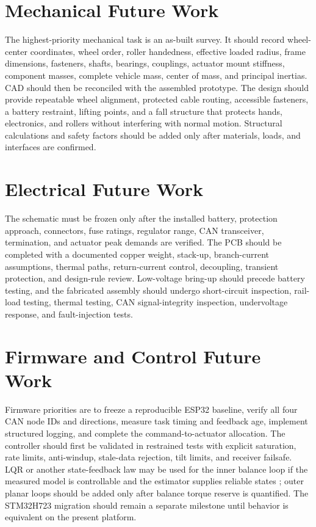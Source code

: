 \section{Mechanical Future Work}\label{mechanical-future-work}

The highest-priority mechanical task is an as-built survey. It should
record wheel-center coordinates, wheel order, roller handedness,
effective loaded radius, frame dimensions, fasteners, shafts, bearings,
couplings, actuator mount stiffness, component masses, complete vehicle
mass, center of mass, and principal inertias. CAD should then be
reconciled with the assembled prototype. The design should provide
repeatable wheel alignment, protected cable routing, accessible
fasteners, a battery restraint, lifting points, and a fall structure
that protects hands, electronics, and rollers without interfering with
normal motion. Structural calculations and safety factors should be
added only after materials, loads, and interfaces are confirmed.

\section{Electrical Future Work}\label{electrical-future-work}

The schematic must be frozen only after the installed battery,
protection approach, connectors, fuse ratings, regulator range, CAN
transceiver, termination, and actuator peak demands are verified. The
PCB should be completed with a documented copper weight, stack-up,
branch-current assumptions, thermal paths, return-current control,
decoupling, transient protection, and design-rule review. Low-voltage
bring-up should precede battery testing, and the fabricated assembly
should undergo short-circuit inspection, rail-load testing, thermal
testing, CAN signal-integrity inspection, undervoltage response, and
fault-injection tests.

\section{Firmware and Control Future Work}\label{firmware-and-control-future-work}

Firmware priorities are to freeze a reproducible ESP32 baseline, verify
all four CAN node IDs and directions, measure task timing and feedback
age, implement structured logging, and complete the command-to-actuator
allocation. The controller should first be validated in restrained tests
with explicit saturation, rate limits, anti-windup, stale-data
rejection, tilt limits, and receiver failsafe. LQR or another
state-feedback law may be used for the inner balance loop if the
measured model is controllable and the estimator supplies reliable
states \cite{anderson1990optimal}; outer planar loops should be added only after balance
torque reserve is quantified. The STM32H723 migration should remain a
separate milestone until behavior is equivalent on the present platform.

